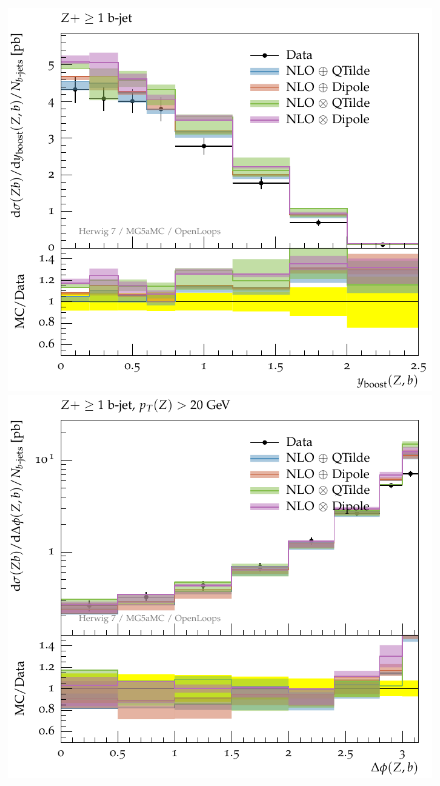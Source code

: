 \documentclass[11pt]{cernrep}
\begin{document}
\begin{figure}[htbp]
\begin{center}
   \includegraphics[scale=0.65]{figs/zbb/herwigzb/atlas-d07-x01-y01.pdf} 
   \includegraphics[scale=0.65]{figs/zbb/herwigzb/atlas-d11-x01-y01.pdf} \\

\end{center}
\end{figure}
\end{document}
